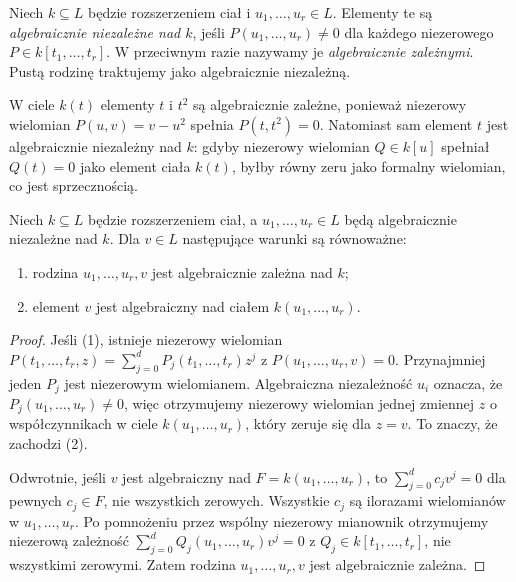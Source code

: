 \begin{definicja}
Niech $k\subseteq L$ będzie rozszerzeniem ciał i
$u_1,\dots,u_r\in L$. Elementy te są
\emph{algebraicznie niezależne nad $k$}, jeśli
$P(u_1,\dots,u_r)\ne0$ dla każdego niezerowego
$P\in k[t_1,\dots,t_r]$. W przeciwnym razie
nazywamy je \emph{algebraicznie zależnymi}.
Pustą rodzinę traktujemy jako algebraicznie niezależną.
\end{definicja}

\begin{przyklad}
W ciele $k(t)$ elementy $t$ i $t^2$ są algebraicznie zależne,
ponieważ niezerowy wielomian $P(u,v)=v-u^2$ spełnia
$P(t,t^2)=0$. Natomiast sam element $t$ jest algebraicznie
niezależny nad $k$: gdyby niezerowy wielomian $Q\in k[u]$
spełniał $Q(t)=0$ jako element ciała $k(t)$,
byłby równy zeru jako formalny wielomian, co jest sprzecznością.
\end{przyklad}

\begin{lemat}
\label{lem:independence-algebraic}
Niech $k\subseteq L$ będzie rozszerzeniem ciał,
a $u_1,\dots,u_r\in L$ będą algebraicznie niezależne nad $k$.
Dla $v\in L$ następujące warunki są równoważne:
\begin{enumerate}[label=\arabic*)]
\item rodzina $u_1,\dots,u_r,v$ jest algebraicznie zależna nad $k$;
\item element $v$ jest algebraiczny nad ciałem $k(u_1,\dots,u_r)$.
\end{enumerate}
\end{lemat}
\begin{proof}
Jeśli (1), istnieje niezerowy wielomian
$P(t_1,\dots,t_r,z)=\sum_{j=0}^d P_j(t_1,\dots,t_r)z^j$
z $P(u_1,\dots,u_r,v)=0$.
Przynajmniej jeden $P_j$ jest niezerowym wielomianem.
Algebraiczna niezależność $u_i$ oznacza, że
$P_j(u_1,\dots,u_r)\ne0$, więc otrzymujemy
niezerowy wielomian jednej zmiennej $z$ o współczynnikach
w ciele $k(u_1,\dots,u_r)$, który zeruje się dla $z=v$.
To znaczy, że zachodzi (2).

Odwrotnie, jeśli $v$ jest algebraiczny nad
$F=k(u_1,\dots,u_r)$, to
$\sum_{j=0}^d c_j v^j=0$ dla pewnych $c_j\in F$,
nie wszystkich zerowych. Wszystkie $c_j$ są ilorazami
wielomianów w $u_1,\dots,u_r$. Po pomnożeniu przez wspólny
niezerowy mianownik otrzymujemy niezerową zależność
$\sum_{j=0}^d Q_j(u_1,\dots,u_r)v^j=0$
z $Q_j\in k[t_1,\dots,t_r]$, nie wszystkimi zerowymi.
Zatem rodzina $u_1,\dots,u_r,v$ jest algebraicznie zależna.
\end{proof}

